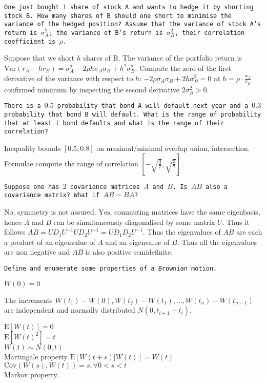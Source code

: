 \texttt{One just bought $1$ share of stock A and wants to hedge it by shorting stock B. How many shares of B should one short to minimise the variance of the hedged position? Assume that the variance of stock A's return is $\sigma_A^2$; the variance of B's return is $\sigma_B^2$, their correlation coefficient is $\rho$.}

Suppose that we short $h$ shares of B. The variance of the portfolio return is $\text{Var}(r_A - h r_B)=\sigma_A^2 - 2 \rho h \sigma_A \sigma_B + h^2 \sigma_B^2$. Compute the zero of the first derivative of the variance with respect to $h$: $-2 \rho \sigma_A \sigma_B + 2 h \sigma_B^2 = 0$ at $h = \boxed{\rho \cdot \frac{\sigma_A}{\sigma_B} }$ confirmed minimum by inspecting the second derivative $2 \sigma_B^2 > 0$.

\texttt{There is a $0.5$ probability that bond A will default next year and a $0.3$ probability that bond B will default. What is the range of probability that at least $1$ bond defaults and what is the range of their correlation?}

Inequality bounds $\boxed{[0.5,0.8]}$ on maximal/minimal overlap union, intersection. Formulae compute the range of correlation $\boxed{\left[-\sqrt{\frac{3}{7}},\sqrt{\frac{3}{7}}\right]}$.

\texttt{Suppose one has $2$ covariance matrices $A$ and $B$. Is $AB$ also a covariance matrix? What if $AB=BA$?}

$\boxed{\text{No}}$, symmetry is not assured. $\boxed{\text{Yes}}$, commuting matrices have the same eigenbasis, hence $A$ and $B$ can be simultaneously diagonalised by some matrix $U$. Thus it follows $AB=UD_1 U^{-1}UD_2 U^{-1}=U D_1 D_2 U^{-1}$. Thus the eigenvalues of $AB$ are each a product of an eigenvalue of $A$ and an eigenvalue of $B$. Thus all the eigenvalues are non negative and $AB$ is also positive semidefinite.

\texttt{Define and enumerate some properties of a Brownian motion.}

$W(0)=0$

The increments $W(t_1)-W(0), W(t_2)-W(t_1),\dots, W(t_n)-W(t_{n-1})$ are independent and normally distributed $N(0,t_{i+1}-t_i)$.

$\text{E}[W(t)] = 0$ \\
$\text{E}[W(t)^2] = t$ \\
$W(t) \sim N(0, t)$ \\
Martingale property $\text{E}[W(t + s)|W(t)] = W(t)$ \\
$\text{Cov}(W(s), W(t)) = s, \forall 0 < s < t$ \\
Markov property.


